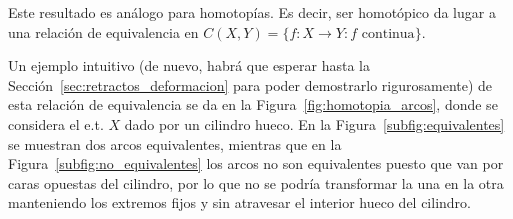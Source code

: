 \begin{observacion}
    Este resultado es análogo para homotopías. Es decir, ser homotópico da lugar a una relación de equivalencia en $C(X,Y) = \{f :X\to Y : f \text{ continua}\}$.
\end{observacion}

Un ejemplo intuitivo (de nuevo, habrá que esperar 
hasta la Sección~\ref{sec:retractos_deformacion} para poder demostrarlo rigurosamente) de esta relación de equivalencia se da en la Figura~\ref{fig:homotopia_arcos}, donde se considera el e.t. $X$ dado por un cilindro hueco. En la Figura~\ref{subfig:equivalentes} se muestran dos arcos equivalentes, mientras que en la Figura~\ref{subfig:no_equivalentes} los arcos no son equivalentes puesto que van por caras opuestas del cilindro, por lo que no se podría transformar la una en la otra manteniendo los extremos fijos y sin atravesar el interior hueco del cilindro.
